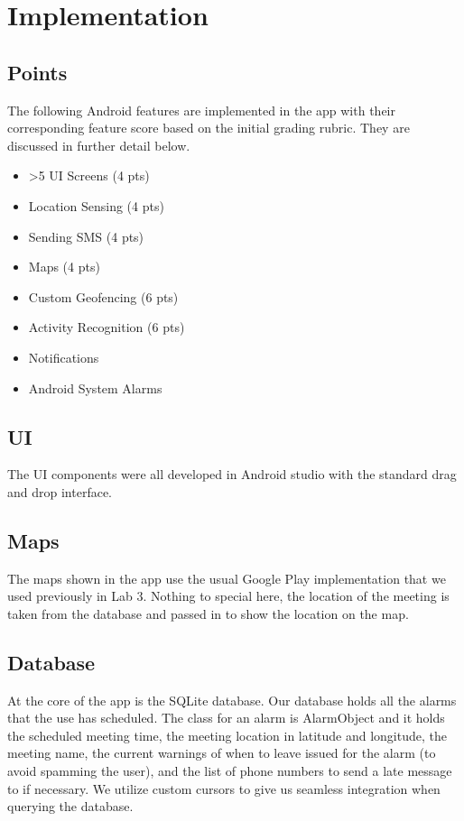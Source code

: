 \section{Implementation}
\subsection{Points}
The following Android features are implemented in the app with their corresponding feature score based on the initial grading rubric.  They are discussed in further detail below.

\begin {itemize}
	\item >5 UI Screens (4 pts)
	\item Location Sensing (4 pts)
	\item Sending SMS (4 pts)
	\item Maps (4 pts)
	\item Custom Geofencing (6 pts)
	\item Activity Recognition (6 pts)
	\item Notifications
	\item Android System Alarms
\end {itemize}

\subsection{UI}
The UI components were all developed in Android studio with the standard drag and drop interface. 

\subsection{Maps}
The maps shown in the app use the usual Google Play implementation that we used previously in Lab 3. Nothing to special here, the location of the meeting is taken from the database and passed in to show the location on the map.

\subsection{Database}
At the core of the app is the SQLite database.  Our database holds all the alarms that the use has scheduled. The class for an alarm is AlarmObject and it holds the scheduled meeting time, the meeting location in latitude and longitude, the meeting name, the current warnings of when to leave issued for the alarm (to avoid spamming the user), and the list of phone numbers to send a late message to if necessary. We utilize custom cursors to give us seamless integration when querying the database. 

